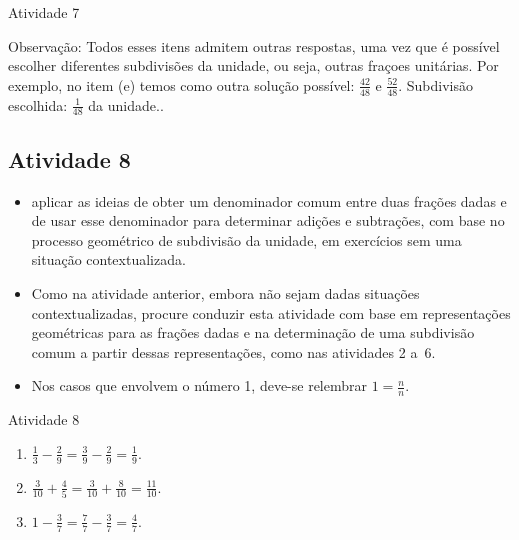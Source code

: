 \begin{multicols}{2}
\begin{resposta*}{Atividade 7}
  
  Observação: Todos esses itens admitem outras respostas, uma vez que é possível escolher diferentes subdivisões da unidade, ou seja, outras fraçoes unitárias. Por exemplo, no item (e) temos como outra solução possível:   $\frac{42}{48}$   e   $\frac{52}{48}$. Subdivisão escolhida:   $\frac{1}{48}$   da unidade..  
\end{resposta*}



\subsection{Atividade 8}

  \newline \vspace{.15cm}  

  \begin{itemize} %
    \item       aplicar as ideias de obter um denominador comum entre duas frações dadas e de usar esse denominador para determinar adições e subtrações, com base no processo geométrico de subdivisão da unidade, em exercícios sem uma situação contextualizada.
  \end{itemize} %
  
  
   \vspace{.15cm}  

  \begin{itemize} %
    \item       Como na atividade anterior, embora não sejam dadas situações contextualizadas, procure conduzir esta atividade com base em representações geométricas para as frações dadas e na determinação de uma subdivisão comum a partir dessas representações, como nas atividades 2 a~6.
    \item  Nos casos que envolvem o número 1, deve-se relembrar   $1 = \frac{n}{n}$.  
  \end{itemize} %

\begin{resposta*}{Atividade 8}  
  
\begin{enumerate} [\quad a)] %
    \item             $\frac{1}{3} - \frac{2}{9} = \frac{3}{9} - \frac{2}{9} = \frac{1}{9}$.
    \item             $\frac{3}{10}+\frac{4}{5} = \frac{3}{10}+\frac{8}{10} =\frac{11}{10}$.
    \item             $1 - \frac{3}{7} = \frac{7}{7} - \frac{3}{7} = \frac{4}{7}$.
\end{enumerate} %
  

\end{resposta*}
\end{multicols}
